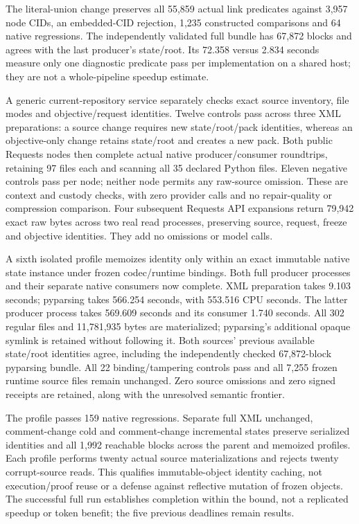 The literal-union change preserves all 55,859 actual link predicates against
3,957 node CIDs, an embedded-CID rejection, 1,235 constructed comparisons and
64 native regressions. The independently validated full bundle has 67,872
blocks and agrees with the last producer's state/root. Its 72.358 versus 2.834
seconds measure only one diagnostic predicate pass per implementation on a
shared host; they are not a whole-pipeline speedup estimate.

A generic current-repository service separately checks exact source inventory,
file modes and objective/request identities. Twelve controls pass across three
XML preparations: a source change requires new state/root/pack identities,
whereas an objective-only change retains state/root and creates a new pack.
Both public Requests nodes then complete actual native producer/consumer
roundtrips, retaining 97 files each and scanning all 35 declared Python files.
Eleven negative controls pass per node; neither node permits any raw-source
omission. These are context and custody checks, with zero provider calls and
no repair-quality or compression comparison.
Four subsequent Requests API expansions return 79,942 exact raw bytes across
two real read processes, preserving source, request, freeze and objective
identities. They add no omissions or model calls.

A sixth isolated profile memoizes identity only within an exact immutable
native state instance under frozen codec/runtime bindings. Both full producer
processes and their separate native consumers now complete. XML preparation
takes 9.103 seconds; pyparsing takes 566.254 seconds, with
553.516 CPU seconds. The latter producer process takes 569.609
seconds and its consumer 1.740 seconds. All 302 regular files and
11,781,935 bytes are materialized; pyparsing's additional opaque symlink is
retained without following it. Both sources' previous available state/root
identities agree, including the independently checked 67,872-block pyparsing
bundle. All 22 binding/tampering controls pass and all 7,255 frozen runtime
source files remain unchanged. Zero source omissions and zero signed receipts
are retained, along with the unresolved semantic frontier.

The profile passes 159 native regressions. Separate full XML unchanged,
comment-change cold and comment-change incremental states preserve serialized
identities and all 1,992 reachable blocks across the parent and memoized
profiles. Each profile performs twenty actual source materializations and
rejects twenty corrupt-source reads. This qualifies immutable-object identity
caching, not execution/proof reuse or a defense against reflective mutation of
frozen objects. The successful full run establishes completion within the bound, not a
replicated speedup or token benefit; the five previous deadlines remain results.

